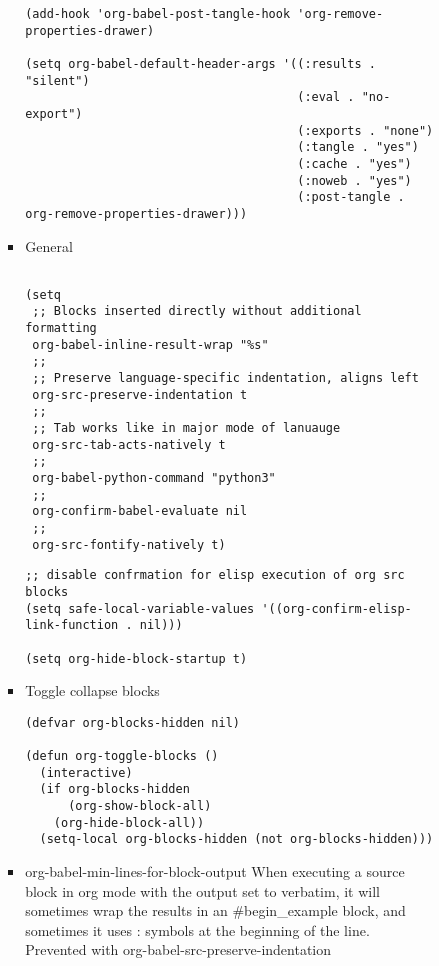 \documentclass{article}
\begin{document}
\begin{itemize}
\begin{itemize}
\begin{itemize}
\begin{itemize}
\begin{verbatim}
(add-hook 'org-babel-post-tangle-hook 'org-remove-properties-drawer)

(setq org-babel-default-header-args '((:results . "silent")
                                      (:eval . "no-export")
                                      (:exports . "none")
                                      (:tangle . "yes")
                                      (:cache . "yes")
                                      (:noweb . "yes")
                                      (:post-tangle . org-remove-properties-drawer)))

\end{verbatim}

\item General
\label{sec:orgbeb0608}
\begin{verbatim}

(setq
 ;; Blocks inserted directly without additional formatting
 org-babel-inline-result-wrap "%s"
 ;;
 ;; Preserve language-specific indentation, aligns left
 org-src-preserve-indentation t
 ;;
 ;; Tab works like in major mode of lanuauge
 org-src-tab-acts-natively t
 ;;
 org-babel-python-command "python3"
 ;;
 org-confirm-babel-evaluate nil
 ;;
 org-src-fontify-natively t)
\end{verbatim}
\begin{verbatim}
;; disable confrmation for elisp execution of org src blocks
(setq safe-local-variable-values '((org-confirm-elisp-link-function . nil)))

(setq org-hide-block-startup t)

\end{verbatim}

\item Toggle collapse blocks
\label{sec:orgd28d215}
\begin{verbatim}
(defvar org-blocks-hidden nil)

(defun org-toggle-blocks ()
  (interactive)
  (if org-blocks-hidden
      (org-show-block-all)
    (org-hide-block-all))
  (setq-local org-blocks-hidden (not org-blocks-hidden)))

\end{verbatim}

\item org-babel-min-lines-for-block-output
\label{sec:orgc8c1737}
When executing a source block in org mode with the output set to verbatim, it will sometimes wrap the results in an \#begin\_example block, and sometimes it uses : symbols at the beginning of the line. Prevented with org-babel-src-preserve-indentation


\end{itemize}
\end{itemize}
\end{itemize}
\end{itemize}
\end{document}
